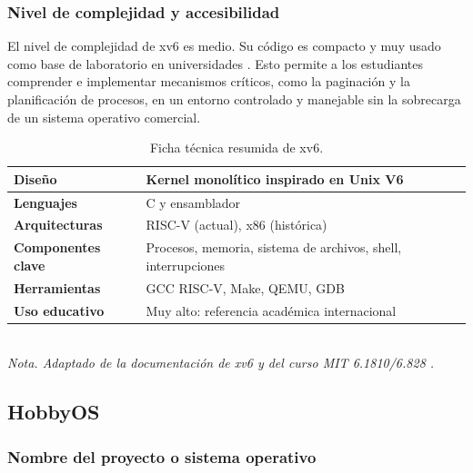 \subsubsection{Nivel de complejidad y accesibilidad}
El nivel de complejidad de xv6 es medio. Su código es compacto y muy usado como base de laboratorio en universidades \cite{xv6_book, xv6_wiki}. Esto permite a los estudiantes comprender e implementar mecanismos críticos, como la paginación y la planificación de procesos, en un entorno controlado y manejable sin la sobrecarga de un sistema operativo comercial.
\begin{table}[H]
    \centering
    \caption{Ficha técnica resumida de xv6.}
    \vspace{2mm}
    \begin{tabular}{p{4cm}p{10cm}}
        \hline
        \textbf{Diseño}            & Kernel monolítico inspirado en Unix V6                               \\ \hline
        \textbf{Lenguajes}         & C y ensamblador                                                      \\
        \textbf{Arquitecturas}     & RISC-V (actual), x86 (histórica)                                     \\
        \textbf{Componentes clave} & Procesos, memoria, sistema de archivos, shell, interrupciones        \\
        \textbf{Herramientas}      & GCC RISC-V, Make, QEMU, GDB                                          \\
        \textbf{Uso educativo}     & Muy alto: referencia académica internacional                         \\
        \hline
    \end{tabular}
    \vspace{1mm} \\
    \textit{Nota. Adaptado de la documentación de xv6 y del curso MIT 6.1810/6.828 \cite{xv6_mit_about, xv6_book}.}
\end{table}


\subsection{HobbyOS}

\subsubsection{Nombre del proyecto o sistema operativo}

